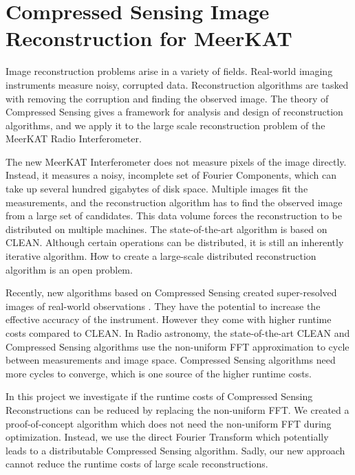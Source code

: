 \section{Compressed Sensing Image Reconstruction for MeerKAT} \label{intro}
Image reconstruction problems arise in a variety of fields. Real-world imaging instruments measure noisy, corrupted data. Reconstruction algorithms are tasked with removing the corruption and finding the observed image. The theory of Compressed Sensing\cite{candes2006robust, donoho2006compressed} gives a framework for analysis and design of reconstruction algorithms, and we apply it to the large scale reconstruction problem of the MeerKAT Radio Interferometer.

The new MeerKAT Interferometer does not measure pixels of the image directly. Instead, it measures a noisy, incomplete set of Fourier Components, which can take up several hundred gigabytes of disk space. Multiple images fit the measurements, and the reconstruction algorithm has to find the observed image from a large set of candidates. This data volume forces the reconstruction to be distributed on multiple machines. 
The state-of-the-art algorithm is based on CLEAN\cite{rich2008multi, rau2011multi}. Although certain operations can be distributed\cite{offringa2014wsclean}, it is still an inherently iterative algorithm. How to create a large-scale distributed reconstruction algorithm is an open problem.

Recently, new algorithms based on Compressed Sensing created super-resolved images of real-world observations \cite{girard2015sparse, dabbech2018cygnus}. They have the potential to increase the effective accuracy of the instrument. However they come with higher runtime costs compared to CLEAN. In Radio astronomy, the state-of-the-art CLEAN and Compressed Sensing algorithms use the non-uniform FFT approximation\cite{kunisnonequispaced, pratley2017robust} to cycle between measurements and image space. Compressed Sensing algorithms need more cycles to converge, which is one source of the higher runtime costs. 

In this project we investigate if the runtime costs of Compressed Sensing Reconstructions can be reduced by replacing the non-uniform FFT. We created a proof-of-concept algorithm which does not need the non-uniform FFT during optimization. Instead, we use the direct Fourier Transform which potentially leads to a distributable Compressed Sensing algorithm. Sadly, our new approach cannot reduce the runtime costs of large scale reconstructions.

